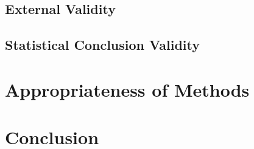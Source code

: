\subsection{External Validity}

\subsection{Statistical Conclusion Validity}

\section{Appropriateness of Methods}

\section{Conclusion}

